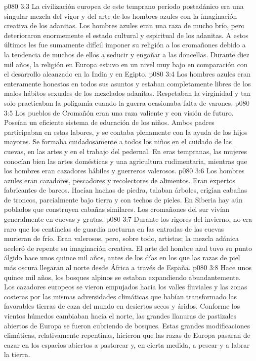 \vs p080 3:3 La civilización europea de este temprano período postadánico era una singular mezcla del vigor y del arte de los hombres azules con la imaginación creativa de los adanitas. Los hombres azules eran una raza de mucho brío, pero deterioraron enormemente el estado cultural y espiritual de los adanitas. A estos últimos les fue sumamente difícil imponer su religión a los cromañones debido a la tendencia de muchos de ellos a seducir y engañar a las doncellas. Durante diez mil años, la religión en Europa estuvo en un nivel muy bajo en comparación con el desarrollo alcanzado en la India y en Egipto.
\vs p080 3:4 Los hombres azules eran enteramente honestos en todos sus asuntos y estaban completamente libres de los malos hábitos sexuales de los mezclados adanitas. Respetaban la virginidad y tan solo practicaban la poligamia cuando la guerra ocasionaba falta de varones.
\vs p080 3:5 Los pueblos de Cromañón eran una raza valiente y con visión de futuro. Poseían un eficiente sistema de educación de los niños. Ambos padres participaban en estas labores, y se contaba plenamente con la ayuda de los hijos mayores. Se formaba cuidadosamente a todos los niños en el cuidado de las cuevas, en las artes y en el trabajo del pedernal. En eras tempranas, las mujeres conocían bien las artes domésticas y una agricultura rudimentaria, mientras que los hombres eran cazadores hábiles y guerreros valerosos.
\vs p080 3:6 Los hombres azules eran cazadores, pescadores y recolectores de alimentos. Eran expertos fabricantes de barcos. Hacían hachas de piedra, talaban árboles, erigían cabañas de troncos, parcialmente bajo tierra y con techos de pieles. En Siberia hay aún poblados que construyen cabañas similares. Los cromañones del sur vivían generalmente en cuevas y grutas.
\vs p080 3:7 Durante los rigores del invierno, no era raro que los centinelas de guardia nocturna en las entradas de las cuevas murieran de frío. Eran valerosos, pero, sobre todo, artistas; la mezcla adánica aceleró de repente su imaginación creativa. El arte del hombre azul tuvo su punto álgido hace unos quince mil años, antes de los días en los que las razas de piel más oscura llegaran al norte desde África a través de España.
\vs p080 3:8 \pc Hace unos quince mil años, los bosques alpinos se estaban expandiendo abundantemente. Los cazadores europeos se vieron empujados hacia los valles fluviales y las zonas costeras por las mismas adversidades climáticas que habían transformado las favorables tierras de caza del mundo en desiertos secos y áridos. Conforme los vientos húmedos cambiaban hacia el norte, las grandes llanuras de pastizales abiertos de Europa se fueron cubriendo de bosques. Estas grandes modificaciones climáticas, relativamente repentinas, hicieron que las razas de Europa pasaran de cazar en los espacios abiertos a pastorear y, en cierta medida, a pescar y a labrar la tierra.
